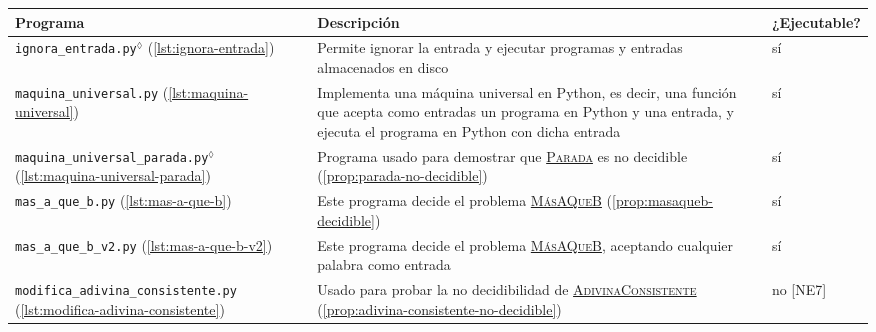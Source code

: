 \newpage

\vspace*{0.9cm}

\begin{tabularx}{\textwidth}{L{0.3} L{0.5} L{0.2}}
\midrule
Programa & Descripción & ¿Ejecutable? \\
\midrule
\texttt{ignora\_entrada.py}$^\lozenge$ \linebreak \small{(\cref{lst:ignora-entrada})} \vspace{4pt} & Permite ignorar la entrada y ejecutar programas y entradas almacenados en disco & sí \\

\texttt{maquina\_universal.py} \linebreak \small{(\cref{lst:maquina-universal})} & Implementa una máquina universal en Python, es decir, una función que acepta como entradas un programa en Python y una entrada, y ejecuta el programa en Python con dicha entrada \vspace{4pt} & sí \\

\texttt{maquina\_universal}\linebreak\texttt{\_parada.py}$^\lozenge$ \linebreak \small{(\cref{lst:maquina-universal-parada})} \vspace{4pt} & Programa usado para demostrar que \hyperref[prob:parada]{\textsc{Parada}} es no decidible (\cref{prop:parada-no-decidible}) & sí \\

\texttt{mas\_a\_que\_b.py} \linebreak \small{(\cref{lst:mas-a-que-b})} & Este programa decide el problema \hyperref[prob:mas-a-que-b]{\textsc{MásAQueB}} (\cref{prop:masaqueb-decidible}) \vspace{4pt} & sí \\

\texttt{mas\_a\_que\_b\_v2.py} \linebreak \small{(\cref{lst:mas-a-que-b-v2})} & Este programa decide el problema \hyperref[prob:mas-a-que-b]{\textsc{MásAQueB}}, aceptando cualquier palabra como entrada \vspace{4pt} & sí \\

\texttt{modifica\_adivina}\linebreak\texttt{\_consistente.py}  \linebreak \small{(\cref{lst:modifica-adivina-consistente})} & Usado para probar la no decidibilidad de \hyperref[prob:adivina-consistente]{\textsc{AdivinaConsistente}} (\cref{prop:adivina-consistente-no-decidible}) \vspace{4pt} & no [NE7] \\


\end{tabularx}
